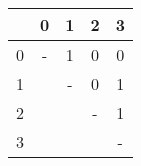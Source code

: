 \begin{tabular}{r|cccc}
	&	0	&	1	&	2	&	3	\\
\hline
0	&	-	&	1	&	0	&	0	\\
1	&		&	-	&	0	&	1	\\
2	&		&		&	-	&	1	\\
3	&		&		&		&	-	\\
\end{tabular}
